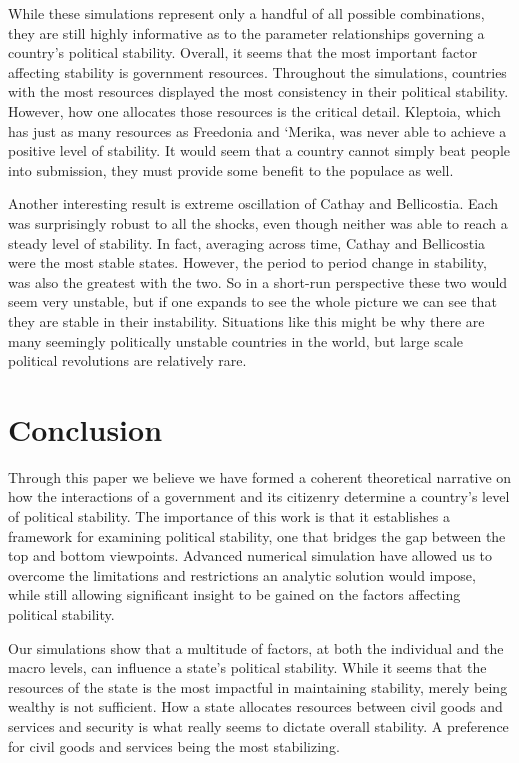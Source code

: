 \documentclass[12pt]{article}
\begin{document}
\begin{spacing}{1.5}

While these simulations represent only a handful of all possible combinations, they are still highly informative as to the parameter relationships governing a country's political stability. Overall, it seems that the most important factor affecting stability is government resources. Throughout the simulations, countries with the most resources displayed the most consistency in their political stability. However, how one allocates those resources is the critical detail. Kleptoia, which has just as many resources as Freedonia and `Merika, was never able to achieve a positive level of stability. It would seem that a country cannot simply beat people into submission, they must provide some benefit to the populace as well. 

Another interesting result is extreme oscillation of Cathay and Bellicostia. Each was surprisingly robust to all the shocks, even though neither was able to reach a steady level of stability. In fact, averaging across time, Cathay and Bellicostia were the most stable states. However, the period to period change in stability, was also the greatest with the two. So in a short-run perspective these two would seem very unstable, but if one expands to see the whole picture we can see that they are stable in their instability. Situations like this might be why there are many seemingly politically unstable countries in the world, but large scale political revolutions are relatively rare.   

\section{Conclusion}

Through this paper we believe we have formed a coherent theoretical narrative on how the interactions of a government and its citizenry determine a country's level of political stability. The importance of this work is that it establishes a framework for examining political stability, one that bridges the gap between the top and bottom viewpoints. Advanced numerical simulation have allowed us to overcome the limitations and restrictions an analytic solution would impose, while still allowing significant insight to be gained on the factors affecting political stability. 
 
Our simulations show that a multitude of factors, at both the individual and the macro levels, can influence a state’s political stability. While it seems that the resources of the state is the most impactful in maintaining stability, merely being wealthy is not sufficient. How a state allocates resources between civil goods and services and security is what really seems to dictate overall stability. A preference for civil goods and services being the most stabilizing. 
 

\end{spacing}
\end{document}
